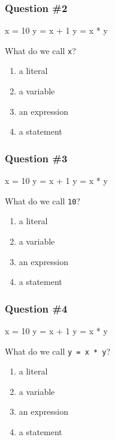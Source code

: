 \documentclass[11pt]{beamer}
\begin{document}
\begin{frame}[fragile]
  \frametitle{Question \#2}
  \Enlarge

  \begin{semiverbatim}
x = 10
y = x + 1
y = x * y
  \end{semiverbatim}
  What do we call \texttt{x}?
  \begin{enumerate}[label=\Alph*]
  \item  a literal
  \item  a variable
  \item  an expression
  \item  a statement
  \end{enumerate}
\end{frame}

\begin{frame}[fragile]
  \frametitle{Question \#3}
  \Enlarge

  \begin{semiverbatim}
x = 10
y = x + 1
y = x * y
  \end{semiverbatim}
  What do we call \texttt{10}?
  \begin{enumerate}[label=\Alph*]
  \item  a literal
  \item  a variable
  \item  an expression
  \item  a statement
  \end{enumerate}
\end{frame}

\begin{frame}[fragile]
  \frametitle{Question \#4}
  \Enlarge

  \begin{semiverbatim}
x = 10
y = x + 1
y = x * y
  \end{semiverbatim}
  What do we call \texttt{y = x * y}?
  \begin{enumerate}[label=\Alph*]
  \item  a literal
  \item  a variable
  \item  an expression
  \item  a statement
  \end{enumerate}
\end{frame}
\end{document}
